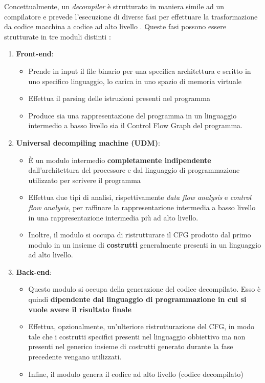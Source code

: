 \documentclass[../main.tex]{subfiles}
\begin{document}
\newpage \noindent
Concettualmente, un \textit{decompiler} è strutturato in maniera simile ad un compilatore e prevede l'esecuzione di diverse fasi per effettuare la trasformazione da codice macchina a codice ad alto livello \cite{Cifuentes1994ReverseCT}. Queste fasi possono essere strutturate in tre moduli distinti \cite{Cifuentes1995DecompilationOB}:
\begin{enumerate}
    \item \textbf{Front-end}:
    \begin{itemize}
        \item Prende in input il file binario per una specifica architettura e scritto in uno specifico linguaggio, lo carica in uno spazio di memoria virtuale
        \item Effettua il parsing delle istruzioni presenti nel programma
        \item Produce sia una rappresentazione del programma in un linguaggio intermedio a basso livello sia il Control Flow Graph del programma.
    \end{itemize}
    \item \textbf{Universal decompiling machine (UDM)}:
    \begin{itemize}
        \item È un modulo intermedio \textbf{completamente indipendente} dall'architettura del processore e dal linguaggio di programmazione utilizzato per scrivere il programma
        \item Effettua due tipi di analisi, rispettivamente \textit{data flow analysis} e \textit{control flow analysis}, per raffinare la rappresentazione intermedia a basso livello in una rappresentazione intermedia più ad alto livello. 
        \item Inoltre, il modulo si occupa di ristrutturare il CFG prodotto dal primo modulo in un insieme di \textbf{costrutti} generalmente presenti in un linguaggio ad alto livello.
    \end{itemize}
    \item \textbf{Back-end}:
    \begin{itemize}
        \item Questo modulo si occupa della generazione del codice decompilato. Esso è quindi \textbf{dipendente dal linguaggio di programmazione in cui si vuole avere il risultato finale}
        \item Effettua, opzionalmente, un'ulteriore ristrutturazione del CFG, in modo tale che i costrutti specifici presenti nel linguaggio obbiettivo ma non presenti nel generico insieme di costrutti generato durante la fase precedente vengano utilizzati.
        \item Infine, il modulo genera il codice ad alto livello (codice decompilato)
    \end{itemize}
\end{enumerate}
\end{document}
